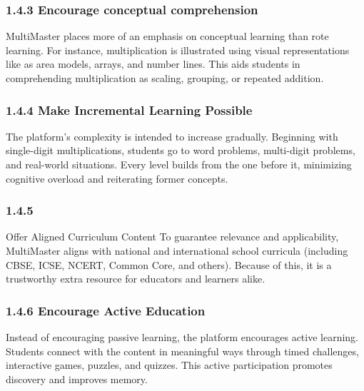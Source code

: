 \documentclass[BTech]{audiss}
\begin{document}
\subsubsection{1.4.3 Encourage conceptual comprehension}
MultiMaster places more of an emphasis on conceptual learning than rote learning. For instance, multiplication is illustrated using visual representations like as area models, arrays, and number lines. This aids students in comprehending multiplication as scaling, grouping, or repeated addition.

\subsubsection{1.4.4 Make Incremental Learning Possible}
The platform's complexity is intended to increase gradually. Beginning with single-digit multiplications, students go to word problems, multi-digit problems, and real-world situations. Every level builds from the one before it, minimizing cognitive overload and reiterating former concepts.

\subsubsection{1.4.5}
Offer Aligned Curriculum Content To guarantee relevance and applicability, MultiMaster aligns with national and international school curricula (including CBSE, ICSE, NCERT, Common Core, and others). Because of this, it is a trustworthy extra resource for educators and learners alike.

\subsubsection{1.4.6 Encourage Active Education}
Instead of encouraging passive learning, the platform encourages active learning. Students connect with the content in meaningful ways through timed challenges, interactive games, puzzles, and quizzes. This active participation promotes discovery and improves memory.


\end{document}
